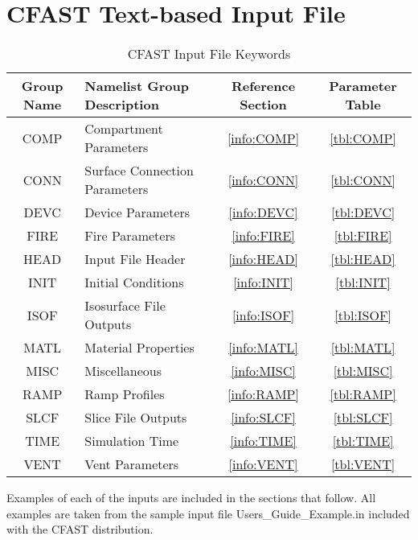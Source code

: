 \chapter{CFAST Text-based Input File}

\begin{table}[ht]
\begin{center}
\caption{CFAST Input File Keywords}
\label{tbl:namelistgroups}
\begin{tabular}{|c|l|c|c|}
\hline
Group Name  & Namelist Group Description& Reference Section & Parameter Table  \\ \hline
{\ct COMP}   & Compartment Parameters         & \ref{info:COMP} & \ref{tbl:COMP}  \\ \hline
{\ct CONN}   & Surface Connection Parameters          & \ref{info:CONN} & \ref{tbl:CONN}  \\ \hline
{\ct DEVC}    & Device Parameters          & \ref{info:DEVC} & \ref{tbl:DEVC}  \\ \hline
{\ct FIRE}     & Fire Parameters  & \ref{info:FIRE} & \ref{tbl:FIRE}  \\ \hline
{\ct HEAD}    & Input File Header            & \ref{info:HEAD} & \ref{tbl:HEAD}  \\ \hline
{\ct INIT}      & Initial Conditions            & \ref{info:INIT} & \ref{tbl:INIT}  \\ \hline
{\ct ISOF}     & Isosurface File Outputs            & \ref{info:ISOF} & \ref{tbl:ISOF}  \\ \hline
{\ct MATL}    & Material Properties           & \ref{info:MATL} & \ref{tbl:MATL}  \\ \hline
{\ct MISC}     & Miscellaneous    & \ref{info:MISC} & \ref{tbl:MISC}  \\ \hline
{\ct RAMP}    & Ramp Profiles            & \ref{info:RAMP} & \ref{tbl:RAMP}  \\ \hline
{\ct SLCF}     & Slice File Outputs       & \ref{info:SLCF} & \ref{tbl:SLCF}  \\ \hline
{\ct TIME}     & Simulation Time            & \ref{info:TIME} & \ref{tbl:TIME}  \\ \hline
{\ct VENT}     & Vent Parameters              & \ref{info:VENT} & \ref{tbl:VENT}  \\ \hline
\end{tabular}
\end{center}
\end{table}

Examples of each of the inputs are included in the sections that follow.  All examples are taken from the sample input file {\ct Users\_Guide\_Example.in} included with the CFAST distribution.

